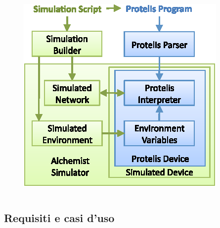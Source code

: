 \begin{frame}{\insertsectionhead}{\insertsubsectionhead}
\begin{columns}
\begin{column}{.35\textwidth}
\begin{figure}
{              \includegraphics[width=.8\textwidth]{res/fig/protelis-alchemist-arch.eps}%
            }%
          \end{figure}
        \end{column}
      \end{columns}
    \end{frame}

    \subsection{Requisiti e casi d'uso}

